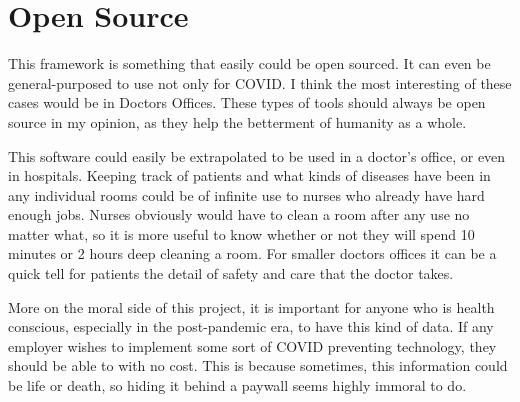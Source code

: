 \documentclass[12pt]{article}
\begin{document}
\section{Open Source}
This framework is something that easily could be open sourced. It can even be general-purposed to use not only for COVID. I think the most interesting of these cases would be in Doctors Offices. These types of tools should always be open source in my opinion, as they help the betterment of humanity as a whole.

This software could easily be extrapolated to be used in a doctor's office, or even in hospitals. Keeping track of patients and what kinds of diseases have been in any individual rooms could be of infinite use to nurses who already have hard enough jobs. Nurses obviously would have to clean a room after any use no matter what, so it is more useful to know whether or not they will spend 10 minutes or 2 hours deep cleaning a room. For smaller doctors offices it can be a quick tell for patients the detail of safety and care that the doctor takes. 

More on the moral side of this project, it is important for anyone who is health conscious, especially in the post-pandemic era, to have this kind of data. If any employer wishes to implement some sort of COVID preventing technology, they should be able to with no cost. This is because sometimes, this information could be life or death, so hiding it behind a paywall seems highly immoral to do. 
\end{document}
